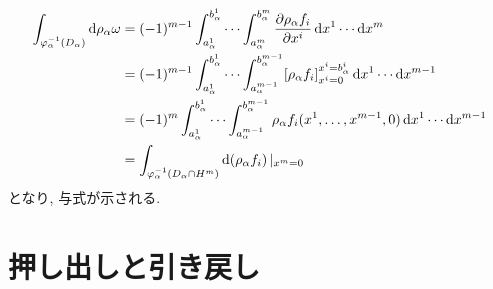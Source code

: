 \documentclass[../main.tex]{subfiles}
\begin{document}
\begin{prf}{}{}
\begin{enumerate}[(i)]
                        \begin{align*}
                            \int_{\varphi_\alpha^{-1}(D_\alpha)} \dd{\rho_\alpha \omega}
                                &= (-1)^{m-1}\int_{a_\alpha^1}^{b_\alpha^1}\cdots\int_{a_\alpha^m}^{b_\alpha^m}
                                        \pdv{\rho_\alpha f_i}{x^i} \dd{x^1}\cdots\dd{x^m} \\
                                &= (-1)^{m-1} \int_{a_\alpha^1}^{b_\alpha^1}\cdots\int_{a_\alpha^{m-1}}^{b_\alpha^{m-1}}
                                        [\rho_\alpha f_i]_{x^i=0}^{x^i=b_\alpha^i} \dd{x^1}\cdots\dd{x^{m-1}} \\
                                &= (-1)^m \int_{a_\alpha^1}^{b_\alpha^1}\cdots\int_{a_\alpha^{m-1}}^{b_\alpha^{m-1}}
                                        \rho_\alpha f_i(x^1,\ldots,x^{m-1},0) \dd{x^1}\cdots\dd{x^{m-1}} \\
                                &= \int_{\varphi_\alpha^{-1}(D_\alpha \cap H^m)} \dd(\rho_\alpha f_i) |_{x^m=0}
                        \end{align*}
                        となり, 与式が示される.
            \end{enumerate}
        \end{prf}

\section{押し出しと引き戻し}
\end{document}
